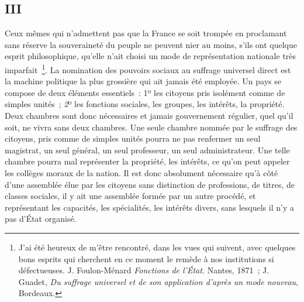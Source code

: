 \documentclass[french,twoside]{book} %
\begin{document}
\subsection[{III}]{III}
\noindent Ceux mêmes qui n’admettent pas que la France se soit trompée en proclamant sans réserve la souveraineté du peuple ne peuvent nier au moins, s’ils ont quelque esprit philosophique, qu’elle n’ait choisi un mode de représentation nationale très imparfait \footnote{ J’ai été heureux de m’être rencontré, dans les vues qui suivent, avec quelques bons esprits qui cherchent en ce moment le remède à nos institutions si défectueuses. J. Foulon-Ménard {\itshape Fonctions de l’État.} Nantes, 1871 ; J. Guadet, {\itshape Du suffrage universel et de son application d’après un mode nouveau}, Bordeaux.}. La nomination des pouvoirs sociaux au suffrage universel direct est la machine politique la plus grossière qui ait jamais été employée. Un pays se compose de deux éléments essentiels : 1º les citoyens pris isolément comme de simples unités ; {\itshape 2}º les fonctions sociales, les groupes, les intérêts, la propriété. Deux chambres sont donc nécessaires et jamais gouvernement régulier, quel qu’il soit, ne vivra sans deux chambres. Une seule chambre nommée par le suffrage des citoyens, pris comme de simples unités pourra ne pas renfermer un seul magistrat, un seul général, un seul professeur, un seul administrateur. Une telle chambre pourra mal représenter la propriété, les intérêts, ce qu’on peut appeler les collèges moraux de la nation. Il est donc absolument nécessaire qu’à côté d’une assemblée élue par les citoyens sans distinction de professions, de titres, de classes sociales, il y ait une assemblée formée par un autre procédé, et représentant les capacités, les spécialités, les intérêts divers, sans lesquels il n’y a pas d’État organisé.\par
\end{document}
